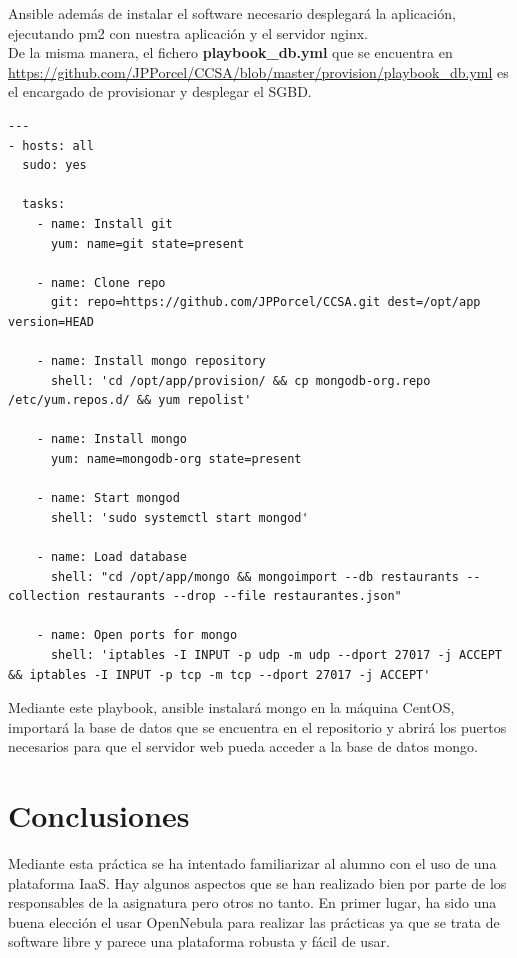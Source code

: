 Ansible además de instalar el software necesario desplegará la aplicación, ejecutando pm2 con nuestra aplicación y el servidor nginx. \\

De la misma manera, el fichero \textbf{playbook\_db.yml} que se encuentra en \url{https://github.com/JPPorcel/CCSA/blob/master/provision/playbook\_db.yml} es el encargado de provisionar y desplegar el SGBD. \\

\begin{lstlisting}
---
- hosts: all
  sudo: yes
  
  tasks:
    - name: Install git
      yum: name=git state=present
    
    - name: Clone repo
      git: repo=https://github.com/JPPorcel/CCSA.git dest=/opt/app version=HEAD
      
    - name: Install mongo repository
      shell: 'cd /opt/app/provision/ && cp mongodb-org.repo /etc/yum.repos.d/ && yum repolist'
      
    - name: Install mongo
      yum: name=mongodb-org state=present
      
    - name: Start mongod
      shell: 'sudo systemctl start mongod'

    - name: Load database
      shell: "cd /opt/app/mongo && mongoimport --db restaurants --collection restaurants --drop --file restaurantes.json"
      
    - name: Open ports for mongo
	  shell: 'iptables -I INPUT -p udp -m udp --dport 27017 -j ACCEPT && iptables -I INPUT -p tcp -m tcp --dport 27017 -j ACCEPT'
\end{lstlisting}

Mediante este playbook, ansible instalará mongo en la máquina CentOS, importará la base de datos que se encuentra en el repositorio y abrirá los puertos necesarios para que el servidor web pueda acceder a la base de datos mongo. \\

\section{Conclusiones}

Mediante esta práctica se ha intentado familiarizar al alumno con el uso de una plataforma IaaS. Hay algunos aspectos que se han realizado bien por parte de los responsables de la asignatura pero otros no tanto. En primer lugar, ha sido una buena elección el usar OpenNebula para realizar las prácticas ya que se trata de software libre y parece una plataforma robusta y fácil de usar. \\

